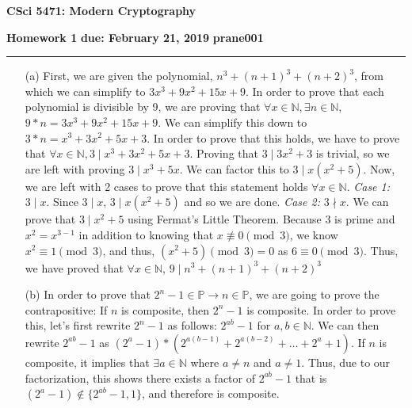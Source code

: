 \documentclass[11pt]{article}
\newcounter{qnum}
\newcommand{\question}[1]{\stepcounter{qnum}\bigskip\noindent{\bf \arabic{qnum}. #1.}}
\newcommand\NetIDa{prane001}
\begin{document}
\begin{center}
{\Large \bf CSci 5471: Modern Cryptography}
\end{center}
{\bf Homework 1} \hfill {\bf due: February 21, 2019}
\newline
{\bf \NetIDa} \hfill  
\medskip
\hrule
\medskip

\question{Number Theory I}
\begin{itemize}
  \item[(a)]   
    First, we are given the polynomial, $n^{3}  + (n+1)^{3} + (n+2)^{3}$, from which we can 
    simplify  to $3 x^{3} + 9 x^{2} + 15 x + 9$. In order to prove that each polynomial is
    divisible by 9, we are proving that $\forall x \in \mathbb{N},  \exists n \in \mathbb{N}$, 
    $9* n =  3 x^{3} + 9 x^{2} + 15 x + 9$. We can simplify this down to
    $3* n =   x^{3} + 3 x^{2} + 5 x + 3$. In order to prove that this holds, we have to prove 
    that $\forall x \in \mathbb{N},  3 \mid x^{3} + 3x^{2} + 5x + 3$. Proving that 
    $3 \mid 3x^{2} + 3$ is trivial, so we are left with proving $3 \mid x^{3} + 5x$. We can factor
    this to $3 \mid x(x^{2} + 5)$. Now, we are left with 2 cases to prove that this statement
    holds $\forall x \in \mathbb{N}$. 
    \newline \textit{Case 1:} $3\mid x$. Since $3\mid x$, $3 \mid x(x^{2} + 5)$ and so we are done.
    \newline \textit{Case 2:} $3\nmid x$. We can prove that $3\mid x^{2} + 5$ using 
    Fermat's Little Theorem. Because 3 is prime and $x^{2} = x^{3-1}$ in addition to knowing
    that $x \not \equiv 0 \pmod{3}$, we know 
    $x^{2} \equiv 1 \pmod{3}$, and thus, $(x^{2} + 5) \pmod{3} = 0$ as $6 \equiv 0 \pmod{3}$. 
    \newline Thus, we have proved that $\forall x \in \mathbb{N}$, $9 \mid n^{3}  + (n+1)^{3} +
    (n+2)^{3}$
  \item[(b)]
    In order to prove that $2^{n} -1 \in \mathbb{P} \rightarrow n \in \mathbb{P}$, we are going to 
    prove the contrapositive: If $n$ is composite, then $2^{n} -1$ is composite. In order to prove
    this, let's first rewrite $2^{n} -1$ as follows: $2^{ab} -1$ for $a,b \in \mathbb{N}$. 
    We can then rewrite $2^{ab} -1$ as $(2^{a} -1) * (2^{a(b-1)} + 2^{a(b-2)} +
    \dots + 2^{a} + 1)$. If $n$ is composite, it implies that $\exists a \in \mathbb{N}$ where
    $a \neq n$ and $a \neq 1$. Thus, due to our factorization, this shows there exists a factor
    of $2^{ab} -1$ that is $(2^{a} -1) \not \in \{2^{ab} -1 , 1\}$, and therefore is composite. 

\end{itemize}
\end{document}
